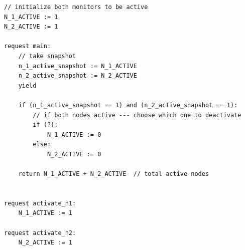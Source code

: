 \begin{minipage}[htbp]{1.0\textwidth}
	\begin{lstlisting}[caption={Snapshot-based monitor deactivation (not serializable)},numbers=none]
// initialize both monitors to be active
N_1_ACTIVE := 1
N_2_ACTIVE := 1

request main:
    // take snapshot
    n_1_active_snapshot := N_1_ACTIVE
    n_2_active_snapshot := N_2_ACTIVE
    yield

    if (n_1_active_snapshot == 1) and (n_2_active_snapshot == 1):
        // if both nodes active --- choose which one to deactivate 
        if (?): 
            N_1_ACTIVE := 0
        else:
            N_2_ACTIVE := 0

    return N_1_ACTIVE + N_2_ACTIVE  // total active nodes


request activate_n1:
    N_1_ACTIVE := 1

request activate_n2:
    N_2_ACTIVE := 1
		
		
	\end{lstlisting}
\end{minipage}








